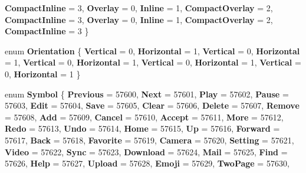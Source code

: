 \begin{DoxyCompactItemize}
{\bfseries Compact\+Inline} = 3, 
\newline
{\bfseries Overlay} = 0, 
{\bfseries Inline} = 1, 
{\bfseries Compact\+Overlay} = 2, 
{\bfseries Compact\+Inline} = 3, 
\newline
{\bfseries Overlay} = 0, 
{\bfseries Inline} = 1, 
{\bfseries Compact\+Overlay} = 2, 
{\bfseries Compact\+Inline} = 3
 \}
\item 
\mbox{\label{namespace_windows_1_1_u_i_1_1_xaml_1_1_controls_a55286136757833c08ae3e37673161c2c}} 
enum {\bfseries Orientation} \{ \newline
{\bfseries Vertical} = 0, 
{\bfseries Horizontal} = 1, 
{\bfseries Vertical} = 0, 
{\bfseries Horizontal} = 1, 
\newline
{\bfseries Vertical} = 0, 
{\bfseries Horizontal} = 1, 
{\bfseries Vertical} = 0, 
{\bfseries Horizontal} = 1, 
\newline
{\bfseries Vertical} = 0, 
{\bfseries Horizontal} = 1
 \}
\item 
\mbox{\label{namespace_windows_1_1_u_i_1_1_xaml_1_1_controls_ab2786e53a8f4a8379dca4f44df7d4497}} 
enum {\bfseries Symbol} \{ \newline
{\bfseries Previous} = 57600, 
{\bfseries Next} = 57601, 
{\bfseries Play} = 57602, 
{\bfseries Pause} = 57603, 
\newline
{\bfseries Edit} = 57604, 
{\bfseries Save} = 57605, 
{\bfseries Clear} = 57606, 
{\bfseries Delete} = 57607, 
\newline
{\bfseries Remove} = 57608, 
{\bfseries Add} = 57609, 
{\bfseries Cancel} = 57610, 
{\bfseries Accept} = 57611, 
\newline
{\bfseries More} = 57612, 
{\bfseries Redo} = 57613, 
{\bfseries Undo} = 57614, 
{\bfseries Home} = 57615, 
\newline
{\bfseries Up} = 57616, 
{\bfseries Forward} = 57617, 
{\bfseries Back} = 57618, 
{\bfseries Favorite} = 57619, 
\newline
{\bfseries Camera} = 57620, 
{\bfseries Setting} = 57621, 
{\bfseries Video} = 57622, 
{\bfseries Sync} = 57623, 
\newline
{\bfseries Download} = 57624, 
{\bfseries Mail} = 57625, 
{\bfseries Find} = 57626, 
{\bfseries Help} = 57627, 
\newline
{\bfseries Upload} = 57628, 
{\bfseries Emoji} = 57629, 
{\bfseries Two\+Page} = 57630, 

\end{DoxyCompactItemize}

